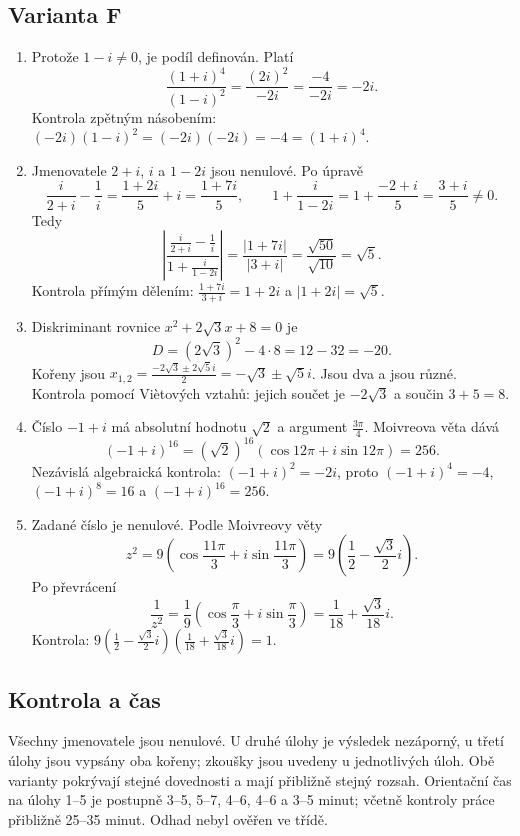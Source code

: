 \documentclass[a4paper,10pt]{article}
\begin{document}
\newpage
\subsection*{Varianta F}
\begin{enumerate}
\item Protože $1-i\ne0$, je podíl definován. Platí
\[
\frac{(1+i)^4}{(1-i)^2}
=\frac{(2i)^2}{-2i}
=\frac{-4}{-2i}=-2i.
\]
Kontrola zpětným násobením: $(-2i)(1-i)^2=(-2i)(-2i)=-4=(1+i)^4$.

\item Jmenovatele $2+i$, $i$ a $1-2i$ jsou nenulové. Po úpravě
\[
\frac{i}{2+i}-\frac1i
=\frac{1+2i}{5}+i=\frac{1+7i}{5},
\qquad
1+\frac{i}{1-2i}
=1+\frac{-2+i}{5}=\frac{3+i}{5}\ne0.
\]
Tedy
\[
\left|\frac{\frac{i}{2+i}-\frac1i}{1+\frac{i}{1-2i}}\right|
=\frac{|1+7i|}{|3+i|}
=\frac{\sqrt{50}}{\sqrt{10}}=\sqrt5.
\]
Kontrola přímým dělením: $\frac{1+7i}{3+i}=1+2i$ a $|1+2i|=\sqrt5$.

\item Diskriminant rovnice $x^2+2\sqrt3x+8=0$ je
\[
D=(2\sqrt3)^2-4\cdot8=12-32=-20.
\]
Kořeny jsou $x_{1,2}=\frac{-2\sqrt3\pm2\sqrt5i}{2}
=-\sqrt3\pm\sqrt5i$.
Jsou dva a jsou různé. Kontrola pomocí Viètových vztahů:
jejich součet je $-2\sqrt3$ a součin $3+5=8$.

\item Číslo $-1+i$ má absolutní hodnotu $\sqrt2$ a argument $\frac{3\pi}{4}$.
Moivreova věta dává
\[
(-1+i)^{16}
=(\sqrt2)^{16}\left(\cos12\pi+i\sin12\pi\right)=256.
\]
Nezávislá algebraická kontrola: $(-1+i)^2=-2i$, proto
$(-1+i)^4=-4$, $(-1+i)^8=16$ a $(-1+i)^{16}=256$.

\item Zadané číslo je nenulové. Podle Moivreovy věty
\[
z^2=9\left(\cos\frac{11\pi}{3}+i\sin\frac{11\pi}{3}\right)
=9\left(\frac12-\frac{\sqrt3}{2}i\right).
\]
Po převrácení
\[
\frac1{z^2}
=\frac19\left(\cos\frac\pi3+i\sin\frac\pi3\right)
=\frac1{18}+\frac{\sqrt3}{18}i.
\]
Kontrola: $9(\frac12-\frac{\sqrt3}{2}i)
(\frac1{18}+\frac{\sqrt3}{18}i)=1$.
\end{enumerate}

\subsection*{Kontrola a čas}
Všechny jmenovatele jsou nenulové. U druhé úlohy je výsledek nezáporný,
u třetí úlohy jsou vypsány oba kořeny; zkoušky jsou uvedeny u jednotlivých
úloh. Obě varianty pokrývají stejné dovednosti a mají přibližně stejný rozsah.
Orientační čas na úlohy 1--5 je postupně 3--5, 5--7, 4--6, 4--6 a 3--5 minut;
včetně kontroly práce přibližně 25--35 minut. Odhad nebyl ověřen ve třídě.
\end{document}
